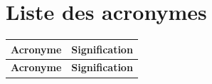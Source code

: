 %

\chapter*{Liste des acronymes}

\begin{longtable}{@{}p{2.6cm}p{11.4cm}@{}}
\toprule
\textbf{Acronyme} & \textbf{Signification} \\
\midrule
\endfirsthead
\toprule
\textbf{Acronyme} & \textbf{Signification} \\
\midrule
\endhead


\end{longtable}
